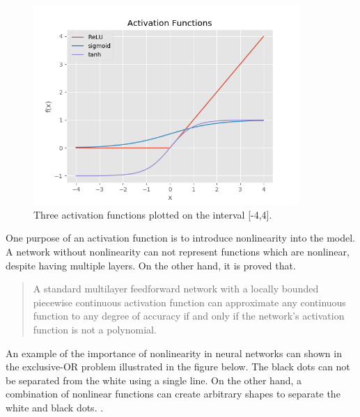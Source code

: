 \begin{figure}[H]
  \centering
    \includegraphics[width=0.9\textwidth]{Assets/Chapter2_Theory/activation_function_overview.png}
    \caption{Three activation functions plotted on the interval [-4,4].}
\end{figure}

One purpose of an activation function is to introduce nonlinearity into the model. A network without nonlinearity can not represent functions which are nonlinear, despite having multiple layers. On the other hand, it is proved that. \cite{leshno1993multilayer} %

\begin{quote}
A standard multilayer feedforward network with a locally bounded piecewise
continuous activation function can approximate any continuous function to any degree of
accuracy if and only if the network's activation function is not a polynomial.
\end{quote}
 An example of the importance of nonlinearity in neural networks can shown in the exclusive-OR problem illustrated in the figure below. The black dots can not be separated from the white using a single line. On the other hand, a combination of nonlinear functions can create arbitrary shapes to separate the white and black dots. \parencite{jain_artificial_1996}\cite{sharma_understanding_2018}. 

